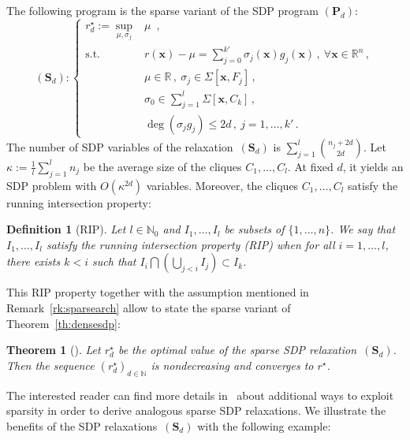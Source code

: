 \documentclass[preprint]{sigplanconf}
\newcommand{\R}{\mathbb{R}}
\newcommand{\N}{\mathbb{N}}
\newcommand{\x}{\mathbf{x}}
\def\P{\mathbf{P}}
\def\S{\mathbf{S}}
\def\S{\mathbf{S}}
\newtheorem{thm}{Theorem}[section]
\theoremstyle{plain}
\newtheorem{definition}[theorem]{Definition}
\begin{document}
The following program is the sparse variant of the SDP program $(\P_d)$:
\[
(\S_d):\left\{			
\begin{array}{rl}
r_d^\star := \sup\limits_{\mu, \sigma_j} & \mu\enspace, \\	 
\text{s.t.} & r (\x) - \mu = \sum\limits_{j = 0}^{k'} \sigma_j(\x) g_j(\x) \,, \ \forall \x \in \R^n \,, \\
& \mu\in \R \,, \ \sigma_j \in \Sigma[\x, F_j] \,, \\
& \sigma_0 \in \sum\limits_{j = 1}^l \Sigma [\x, C_k] \,, \\
& \deg (\sigma_j g_j) \leq 2 d  \,, \ j = 1,\dots,k' \,.
\end{array} \right.
\]
%
The number of SDP variables of the relaxation~$(\S_d)$ is $\sum_{j=1}^l \binom{n_j + 2 d}{2 d}$. Let $\kappa := \frac{1}{l} \sum_{j=1}^l n_j$ be the average size of the cliques $C_1, \dots, C_l$. At fixed $d$, it yields an SDP problem with $O(\kappa^{2d})$ variables.
%
Moreover, the cliques $C_1, \dots, C_l$ satisfy the running intersection property: 
%
\begin{definition}[RIP]
\label{def:rip}
Let $l \in \N_0$  and $I_1, \dots, I_l$ be subsets of $\{1, \dots, n\}$. We say that $I_1, \dots, I_l$ satisfy the running intersection property (RIP) when for all $i=1, \dots, l$, there exists $k < i$ such that $I_i \bigcap (\bigcup_{j < i} I_j) \subset I_k$.
\end{definition}
This RIP property together with the assumption mentioned in Remark~\ref{rk:sparsearch} allow to state the sparse variant of Theorem~\ref{th:densesdp}:
%
\begin{thm}[]
\label{th:sparsesdp}
Let $r_d^{\star}$ be the optimal value of the sparse SDP relaxation~$(\S_d)$. Then the sequence $(r_d^{\star})_{d \in \N}$ is nondecreasing and converges to $r^\star$.
\end{thm}
The interested reader can find more details in~\cite{Waki06SparseSOS} about additional ways to exploit sparsity in order to derive analogous sparse SDP relaxations.
We illustrate the benefits of the SDP relaxations~$(\S_d)$ with the following example:
\end{document}
